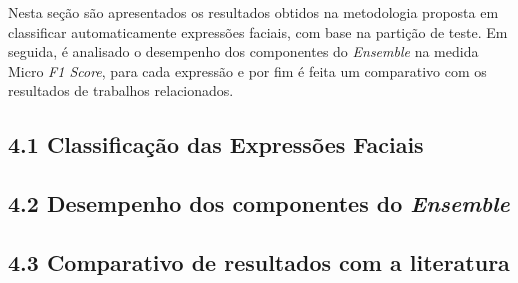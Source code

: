 Nesta seção são apresentados os resultados obtidos na metodologia proposta em classificar automaticamente expressões faciais, com base na partição de teste. Em seguida, é analisado o desempenho dos componentes do \textit{Ensemble} na medida Micro \textit{F1 Score}, para cada expressão e por fim  é feita um comparativo com os resultados de trabalhos relacionados. 

\subsection{4.1 Classificação das Expressões Faciais}


\subsection{4.2 Desempenho dos componentes do \textit{Ensemble}}


\subsection{4.3 Comparativo de resultados com a literatura}


